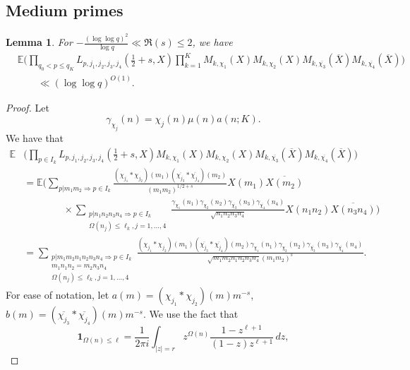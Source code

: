 \documentclass[12pt, reqno]{amsart}
\newcommand{\E}{\mathbb{E}}
\newtheorem{lemma}[theorem]{Lemma}
\numberwithin{equation}{section}
\numberwithin{theorem}{section}
\numberwithin{equation}{section}
\begin{document}
\subsection{Medium primes}
\begin{lemma}
\label{medium}
  For $-\frac{(\log \log q)^2}{\log q} \ll  \Re(s) \leq 2$,  we have
  \begin{align*}
      & \E \Bigg( \prod_{q_0 <p \leq q_K} L_{p,j_1,j_2,j_3,j_4} ( \tfrac{1}{2}+s,X ) \prod_{k=1}^K M_{k,\chi_1}(X)M_{k,\chi_2}(X) M_{k,\overline{\chi_3}}(\overline{X})M_{k,\overline{\chi_4}}(\overline{X}) \Bigg) \\
  &\qquad\ll (\log \log q)^{O(1)}.
   \end{align*}
\end{lemma}
\begin{proof}
    Let $$\gamma_{\chi_j}(n) = \chi_j(n) \mu(n) a(n;K) . $$ We have that 
    \begin{align}
        \E  & \Bigg(   \prod_{p \in I_k} L_{p,j_1,j_2,j_3,j_4}( \tfrac{1}{2}+s,X)  M_{k,\chi_1}(X)M_{k,\chi_2}(X) M_{k,\overline{\chi_3}}(\overline{X})M_{k,\overline{\chi_4}}(\overline{X}) \Bigg) \nonumber \\
        &= \E \Bigg( \sum_{p|m_1m_2 \Rightarrow p \in I_k} \frac{ (\chi_{j_1} * \chi_{j_2})(m_1) (\overline{\chi_{j_3}} * \overline{\chi_{j_4}})(m_2)}{(m_1m_2)^{1/2+s}} X(m_1) \overline{X(m_2)}  \nonumber \\
        & \qquad\qquad\times \sum_{\substack{p |n_1n_2n_3n_4 \Rightarrow p \in I_k \\ \Omega(n_j) \leq \ell_k, j=1,\ldots,4}} \frac{\gamma_{\chi_{1}}(n_1) \gamma_{\chi_{2}}(n_2) \gamma_{\overline{\chi_{3}}}(n_3) \gamma_{\overline{\chi_{4}}}(n_4)}{\sqrt{n_1n_2n_3n_4}} X(n_1n_2) \overline{X(n_3n_4)}\Bigg) \nonumber \\
        &= \sum_{\substack{ p |m_1m_2n_1n_2n_3n_4 \Rightarrow p \in I_k \\ m_1n_1n_2=m_2n_3n_4 \\ \Omega(n_j) \leq \ell_k, j=1,\ldots,4}} \frac{ (\chi_{j_1} * \chi_{j_2})(m_1) (\overline{\chi_{j_3}} * \overline{\chi_{j_4}})(m_2) \gamma_{\chi_1}(n_1) \gamma_{\chi_2}(n_2) \gamma_{\overline{\chi_3}}(n_3) \gamma_{\overline{\chi_4}}(n_4) }{\sqrt{m_1m_2n_1n_2n_3n_4} (m_1m_2)^s}.\label{exp2}
    \end{align}
    For ease of notation, let $a(m) = (\chi_{j_1} *\chi_{j_2})(m)m^{-s}$, $b(m) = (\overline{\chi_{j_3}}*\overline{\chi_{j_4}})(m) m^{-s}.$
    We use the fact that
    $$ \mathbf{1}_{\Omega(n) \leq \ell}= \frac{1}{2 \pi i } \int_{|z|=r} z^{\Omega(n)} \frac{1-z^{\ell+1}}{(1-z)z^{\ell+1}} \, dz,$$

\end{proof}
\end{document}
